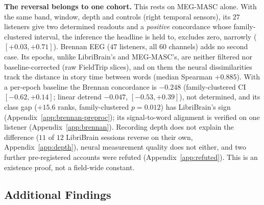\documentclass{article}
\begin{document}
\textbf{The reversal belongs to one cohort.} This rests on MEG-MASC alone. With the same band,
window, depth and controls (right temporal sensors), its $27$ listeners give two determined readouts
and a \emph{positive} concordance whose family-clustered interval, the inference the headline is held
to, excludes zero, narrowly ($[+0.03, +0.71]$). Brennan EEG ($47$ listeners, all $60$ channels) adds no
second case. Its epochs, unlike LibriBrain's and MEG-MASC's, are neither filtered nor baseline-corrected
(raw FieldTrip slices), and on them the neural dissimilarities track the distance in story time between
words (median Spearman $+0.885$). With a per-epoch baseline the Brennan concordance is $-0.248$
(family-clustered CI $[-0.62, +0.14]$; linear detrend $-0.047$, $[-0.53, +0.39]$), not determined, and its
class gap ($+15.6$ ranks, family-clustered $p=0.012$) has LibriBrain's sign
(Appendix~\ref{app:brennan-preproc}); its signal-to-word alignment is verified on one listener
(Appendix~\ref{app:brennan}). Recording depth
does not explain the difference ($11$ of $12$ LibriBrain sessions reverse on their own,
Appendix~\ref{app:depth}), neural measurement quality does not either, and two further
pre-registered accounts were refuted (Appendix~\ref{app:refuted}). This is an
existence proof, not a field-wide constant.

\subsection{Additional Findings}\label{sec:appendix-findings}
\end{document}
